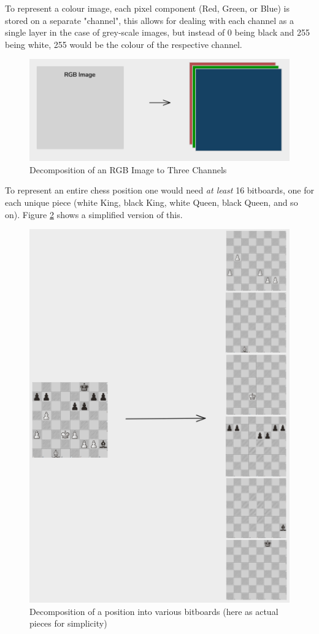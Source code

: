 To represent a colour image, each pixel component (Red, Green, or Blue) is stored on a separate "channel", this allows for dealing with each channel as a single layer in the case of grey-scale images, but instead of 0 being black and 255 being white, 255 would be the colour of the respective channel.

\begin{figure}[H]
    \centering
    \includegraphics[scale=0.5]{images/RGBtoChannels.png}
    \caption{Decomposition of an RGB Image to Three Channels}
    \label{fig: RGBChannels}
\end{figure}

To represent an entire chess position one would need \textit{at least} 16 bitboards, one for each unique piece (white King, black King, white Queen, black Queen, and so on). Figure \ref{fig: Bitboards} shows a simplified version of this.

\begin{figure}[H]
    \centering
    \includegraphics[scale=0.75]{images/BitboardDecomp.png}
    \caption{Decomposition of a position into various bitboards (here as actual pieces for simplicity)}
    \label{fig: Bitboards}
\end{figure}

